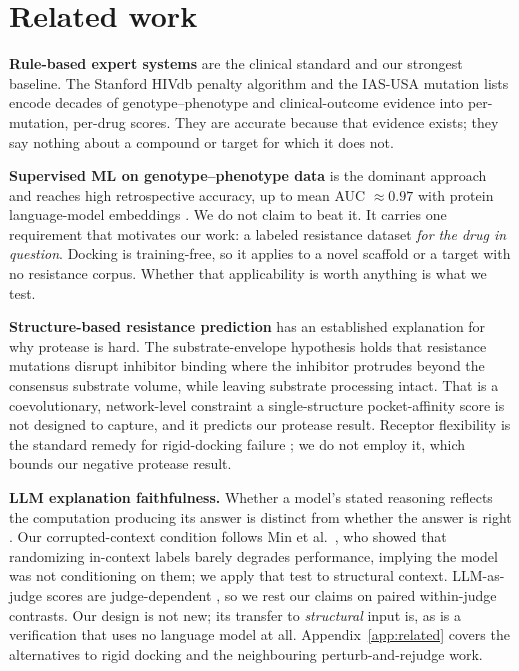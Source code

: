\documentclass{article}
\begin{document}
\section{Related work}

\textbf{Rule-based expert systems} are the clinical standard and our strongest baseline. The Stanford HIVdb penalty algorithm \citep{liu2006,rhee2006} and the IAS-USA mutation lists \citep{iasusa} encode decades of genotype--phenotype and clinical-outcome evidence into per-mutation, per-drug scores. They are accurate because that evidence exists; they say nothing about a compound or target for which it does not.

\textbf{Supervised ML on genotype--phenotype data} is the dominant approach and reaches high retrospective accuracy, up to mean AUC $\approx0.97$ with protein language-model embeddings \citep{beerenwinkel2003,steiner2020,blassel2021,farquhar2026}. We do not claim to beat it. It carries one requirement that motivates our work: a labeled resistance dataset \emph{for the drug in question}. Docking is training-free, so it applies to a novel scaffold or a target with no resistance corpus. Whether that applicability is worth anything is what we test.

\textbf{Structure-based resistance prediction} has an established explanation for why protease is hard. The substrate-envelope hypothesis \citep{king2004,nalam2010} holds that resistance mutations disrupt inhibitor binding where the inhibitor protrudes beyond the consensus substrate volume, while leaving substrate processing intact. That is a coevolutionary, network-level constraint a single-structure pocket-affinity score is not designed to capture, and it predicts our protease result. Receptor flexibility is the standard remedy for rigid-docking failure \citep{amaro2008}; we do not employ it, which bounds our negative protease result.

\textbf{LLM explanation faithfulness.} Whether a model's stated reasoning reflects the computation producing its answer is distinct from whether the answer is right \citep{jacovi2020,turpin2023}. Our corrupted-context condition follows Min et al.~\citep{min2022}, who showed that randomizing in-context labels barely degrades performance, implying the model was not conditioning on them; we apply that test to structural context. LLM-as-judge scores are judge-dependent \citep{zheng2023}, so we rest our claims on paired within-judge contrasts. Our design is not new; its transfer to \emph{structural} input is, as is a verification that uses no language model at all. Appendix~\ref{app:related} covers the alternatives to rigid docking and the neighbouring perturb-and-rejudge work.
\end{document}
